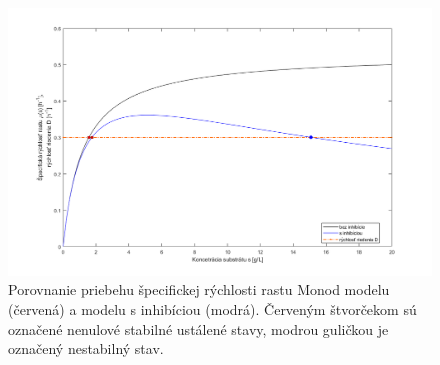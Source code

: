 \begin{figure}[H]
	\centering
	\includegraphics[width=1\linewidth]{images/spec_grow_rate_comparison}
	\caption[]{Porovnanie priebehu špecifickej rýchlosti rastu Monod modelu (červená) a modelu s inhibíciou (modrá). Červeným štvorčekom sú označené nenulové stabilné ustálené stavy, modrou guličkou je označený nestabilný stav.}
	\label{fig:2}
\end{figure}

